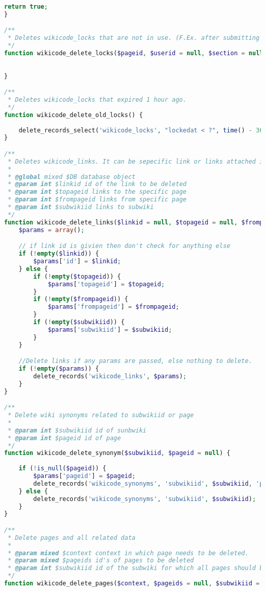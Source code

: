 \begin{lstlisting}[language=PHP]
    return true;
}

/**
 * Deletes wikicode_locks that are not in use. (F.Ex. after submitting the changes). If no userid is present, it deletes ALL the wikicode_locks of a specific page.
 */
function wikicode_delete_locks($pageid, $userid = null, $section = null, $delete_from_db = true, $delete_section_and_page = false) {
    
    
}

/**
 * Deletes wikicode_locks that expired 1 hour ago.
 */
function wikicode_delete_old_locks() {
    
    delete_records_select('wikicode_locks', "lockedat < ?", time() - 3600);
}

/**
 * Deletes wikicode_links. It can be sepecific link or links attached in subwiki
 *
 * @global mixed $DB database object
 * @param int $linkid id of the link to be deleted
 * @param int $topageid links to the specific page
 * @param int $frompageid links from specific page
 * @param int $subwikiid links to subwiki
 */
function wikicode_delete_links($linkid = null, $topageid = null, $frompageid = null, $subwikiid = null) {
    $params = array();

    // if link id is givien then don't check for anything else
    if (!empty($linkid)) {
        $params['id'] = $linkid;
    } else {
        if (!empty($topageid)) {
            $params['topageid'] = $topageid;
        }
        if (!empty($frompageid)) {
            $params['frompageid'] = $frompageid;
        }
        if (!empty($subwikiid)) {
            $params['subwikiid'] = $subwikiid;
        }
    }

    //Delete links if any params are passed, else nothing to delete.
    if (!empty($params)) {
        delete_records('wikicode_links', $params);
    }
}

/**
 * Delete wiki synonyms related to subwikiid or page
 *
 * @param int $subwikiid id of sunbwiki
 * @param int $pageid id of page
 */
function wikicode_delete_synonym($subwikiid, $pageid = null) {
    
    if (!is_null($pageid)) {
        $params['pageid'] = $pageid;
		delete_records('wikicode_synonyms', 'subwikiid', $subwikiid, 'pageid', $pageid);
    } else {
    	delete_records('wikicode_synonyms', 'subwikiid', $subwikiid);
	}
}

/**
 * Delete pages and all related data
 *
 * @param mixed $context context in which page needs to be deleted.
 * @param mixed $pageids id's of pages to be deleted
 * @param int $subwikiid id of the subwiki for which all pages should be deleted
 */
function wikicode_delete_pages($context, $pageids = null, $subwikiid = null) {
    

\end{lstlisting}
